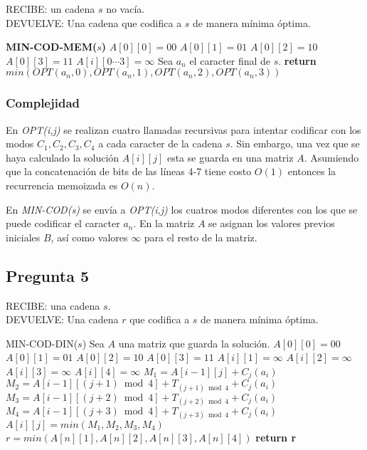\vspace{0.5cm}

\noindent RECIBE: un cadena $s$ no vacía.\\
DEVUELVE: Una cadena que codifica a $s$ de manera mínima óptima.
\begin{algorithmic}[1]
\item[]{\textbf{MIN-COD-MEM($s$)}}
\State $A[0][0] = 00$ 
\State $A[0][1] = 01$ 
\State $A[0][2] = 10$ 
\State $A[0][3] = 11$
    \State $A[i][0\cdots3] = \infty$ 
\EndFor 
\State Sea $a_n$ el caracter final de $s$.  
\State \textbf{return} $min(OPT(a_n,0), OPT(a_n,1), OPT(a_n,2), OPT(a_n,3))$  
\end{algorithmic}


\subsubsection{Complejidad}

En \emph{OPT(i,j)} se realizan cuatro llamadas recursivas para intentar codificar con los modos $C_1,C_2,C_3,C_4$ 
a cada caracter de la cadena $s$. Sin embargo, una vez que se haya calculado la solución $A[i][j]$ esta se guarda en 
una matriz $A$. Asumiendo que la concatenación de bits de las líneas 4-7 tiene costo $O(1)$ entonces la 
recurrencia memoizada es $O(n)$.

En \emph{MIN-COD(s)} se envía a \emph{OPT(i,j)} los cuatros modos diferentes con los que se puede codificar el caracter 
$a_n$. En la matriz $A$ se asignan los valores previos iniciales $B$, así como valores $\infty$ para el resto de la matriz.

\newpage

\subsection{Pregunta 5}
\noindent RECIBE: una cadena $s$.\\
DEVUELVE: Una cadena $r$ que codifica a $s$ de manera mínima óptima.

\begin{algorithmic}[1]
\item[]{MIN-COD-DIN($s$)}
\State Sea $A$ una matriz que guarda la solución.
\State $A[0][0] = 00$ 
\State $A[0][1] = 01$ 
\State $A[0][2] = 10$ 
\State $A[0][3] = 11$
    \State $A[i][1] = \infty$
    \State $A[i][2] = \infty$
    \State $A[i][3] = \infty$
    \State $A[i][4] = \infty$
            \State $M_1 = A[i-1][j] + C_j(a_i)$
            \State $M_2 = A[i-1][(j+1)\bmod{4}] + T_{(j+1)\bmod{4}} + C_{j}(a_i)$
            \State $M_3 = A[i-1][(j+2)\bmod{4}] + T_{(j+2)\bmod{4}} + C_{j}(a_i)$
            \State $M_4 = A[i-1][(j+3)\bmod{4}] + T_{(j+3)\bmod{4}} + C_{j}(a_i)$
            \State $A[i][j] = min(M_1, M_2, M_3, M_4)$
            \State
        \EndIf
    \EndFor
\EndFor
\State $r = min(A[n][1], A[n][2], A[n][3], A[n][4])$
\State \textbf{return r}
\end{algorithmic}


